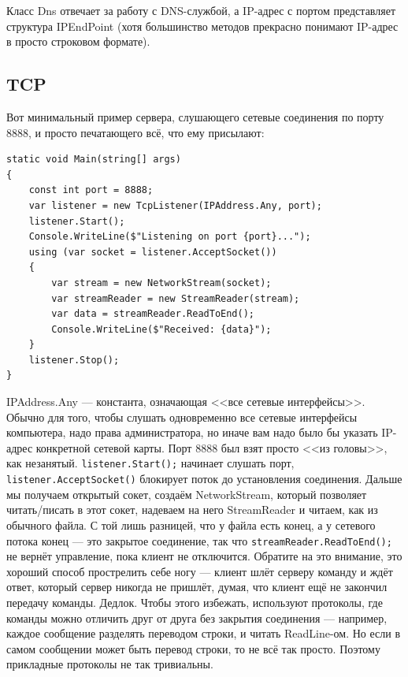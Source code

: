 \documentclass[a5paper]{article}
\begin{document}
Класс Dns отвечает за работу с DNS-службой, а IP-адрес с портом представляет структура IPEndPoint (хотя большинство методов прекрасно понимают IP-адрес в просто строковом формате).

\subsection{TCP}

Вот минимальный пример сервера, слушающего сетевые соединения по порту 8888, и просто печатающего всё, что ему присылают:

\begin{verbatim}
static void Main(string[] args)
{
    const int port = 8888;
    var listener = new TcpListener(IPAddress.Any, port);
    listener.Start();
    Console.WriteLine($"Listening on port {port}...");
    using (var socket = listener.AcceptSocket())
    {
        var stream = new NetworkStream(socket);
        var streamReader = new StreamReader(stream);
        var data = streamReader.ReadToEnd();
        Console.WriteLine($"Received: {data}");
    }
    listener.Stop();
}
\end{verbatim}

IPAddress.Any --- константа, означающая <<все сетевые интерфейсы>>. Обычно для того, чтобы слушать одновременно все сетевые интерфейсы компьютера, надо права администратора, но иначе вам надо было бы указать IP-адрес конкретной сетевой карты. Порт 8888 был взят просто <<из головы>>, как незанятый. \texttt{listener.Start();} начинает слушать порт, \texttt{listener.AcceptSocket()} блокирует поток до установления соединения. Дальше мы получаем открытый сокет, создаём NetworkStream, который позволяет читать/писать в этот сокет, надеваем на него StreamReader и читаем, как из обычного файла. С той лишь разницей, что у файла есть конец, а у сетевого потока конец --- это закрытое соединение, так что \texttt{streamReader.ReadToEnd();} не вернёт управление, пока клиент не отключится. Обратите на это внимание, это хороший способ прострелить себе ногу --- клиент шлёт серверу команду и ждёт ответ, который сервер никогда не пришлёт, думая, что клиент ещё не закончил передачу команды. Дедлок. Чтобы этого избежать, используют протоколы, где команды можно отличить друг от друга без закрытия соединения --- например, каждое сообщение разделять переводом строки, и читать ReadLine-ом. Но если в самом сообщении может быть перевод строки, то не всё так просто. Поэтому прикладные протоколы не так тривиальны.
\end{document}
